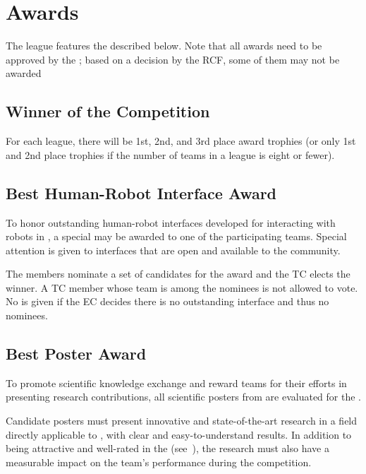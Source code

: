 \section{Awards}\label{sec:awards}

The \AtHome{} league features the  described below.
Note that all awards need to be approved by the \RCF{}; based on a decision by the RCF, some of them may not be awarded

\subsection{Winner of the Competition}\label{award:winner}

For each league, there will be 1st, 2nd, and 3rd place award trophies (or only 1st and 2nd place trophies if the number of teams in a league is eight or fewer).

\subsection{Best Human-Robot Interface Award}\label{award:hri}

To honor outstanding human-robot interfaces developed for interacting with robots in \AtHome{}, a special \HRIAward{} may be awarded to one of the participating teams.
Special attention is given to interfaces that are open and available to the \AtHome{} community.

The \AtHome{} \EC{} members nominate a set of candidates for the award and the TC elects the winner.
A TC member whose team is among the nominees is not allowed to vote.
No \HRIAward{} is given if the EC decides there is no outstanding interface and thus no nominees.

\subsection{Best Poster Award}\label{award:poster}

To promote scientific knowledge exchange and reward teams for their efforts in presenting research contributions, all scientific posters from are evaluated for the \OPLPosterAward{}.

Candidate posters must present innovative and state-of-the-art research in a field directly applicable to \AtHome{}, with clear and easy-to-understand results.
In addition to being attractive and well-rated in the \PS{} (see~), the research must also have a measurable impact on the team's performance during the competition.

